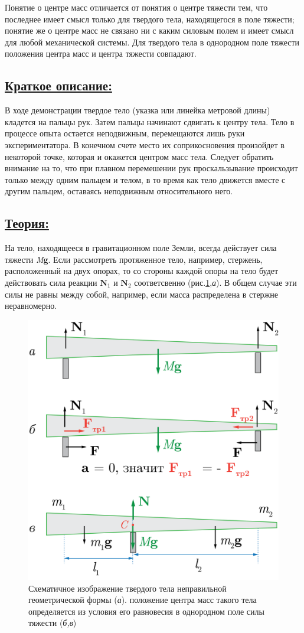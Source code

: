 \documentclass[14pt,a4paper,oneside]{extarticle}	%
\begin{document}
	Понятие о центре масс отличается от понятия о центре тяжести тем, 
	что последнее имеет смысл только для твердого тела, находящегося в поле тяжести;
	понятие же о центре масс не связано ни с каким силовым полем и имеет смысл для любой механической системы. 
	Для твердого тела в однородном поле тяжести положения центра масс и центра тяжести совпадают. 
	
\subsection*{\underline{Краткое описание:}}
	
В ходе демонстрации твердое тело (указка или линейка метровой длины) кладется на пальцы рук.
Затем пальцы начинают сдвигать к центру тела. Тело в процессе опыта остается неподвижным, перемещаются лишь руки экспериментатора.
В конечном счете место их соприкосновения произойдет в некоторой точке, которая и окажется центром масс тела.
Следует обратить внимание на то, что при плавном перемешении рук проскальзывание происходит только между одним пальцем и телом, в то время как тело движется вместе с другим пальцем, оставаясь неподвижным относительного него.

\subsection*{\underline{Теория:}}
		
		На тело, находящееся в гравитационном поле Земли, всегда действует сила тяжести \textit{M}\textbf{g}.
		Если рассмотреть протяженное тело, например, стержень, расположенный на двух опорах, то со стороны каждой опоры на тело будет действовать сила реакции $ \textbf{N}_1 $ и $ \textbf{N}_2 $ соответсвенно (рис.\ref{center-2},\textit{а}).
		В общем случае эти силы не равны между собой, например, если масса распределена в стержне неравномерно.
		
		\begin{figure}[H]
			\centering 	
			\includegraphics[width=0.55\linewidth]{center-2.png}
			\caption{Схематичное изображение твердого тела неправильной геометрической формы (\textit{а}). 
				положение центра масс такого тела определяется из условия его равновесия в однородном поле силы тяжести (\textit{б,в})}
			\label{center-2}
		\end{figure}
	
\end{document}

